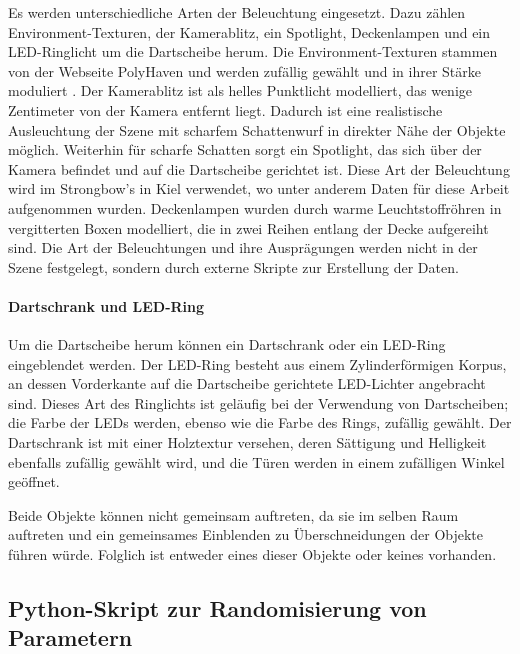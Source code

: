 Es werden unterschiedliche Arten der Beleuchtung eingesetzt. Dazu zählen Environment-Texturen, der Kamerablitz, ein Spotlight, Deckenlampen und ein LED-Ringlicht um die Dartscheibe herum. Die Environment-Texturen stammen von der Webseite PolyHaven und werden zufällig gewählt und in ihrer Stärke moduliert \cite{polyhaven}. Der Kamerablitz ist als helles Punktlicht modelliert, das wenige Zentimeter von der Kamera entfernt liegt. Dadurch ist eine realistische Ausleuchtung der Szene mit scharfem Schattenwurf in direkter Nähe der Objekte möglich. Weiterhin für scharfe Schatten sorgt ein Spotlight, das sich über der Kamera befindet und auf die Dartscheibe gerichtet ist. Diese Art der Beleuchtung wird im Strongbow's in Kiel verwendet, wo unter anderem Daten für diese Arbeit aufgenommen wurden. Deckenlampen wurden durch warme Leuchtstoffröhren in vergitterten Boxen modelliert, die in zwei Reihen entlang der Decke aufgereiht sind. Die Art der Beleuchtungen und ihre Ausprägungen werden nicht in der Szene festgelegt, sondern durch externe Skripte zur Erstellung der Daten.

\paragraph{Dartschrank und LED-Ring}
\label{sec:impl:daten:blender:nebenobjekte:cabinet}

Um die Dartscheibe herum können ein Dartschrank oder ein LED-Ring eingeblendet werden. Der LED-Ring besteht aus einem Zylinderförmigen Korpus, an dessen Vorderkante auf die Dartscheibe gerichtete LED-Lichter angebracht sind. Dieses Art des Ringlichts ist geläufig bei der Verwendung von Dartscheiben; die Farbe der LEDs werden, ebenso wie die Farbe des Rings, zufällig gewählt. Der Dartschrank ist mit einer Holztextur versehen, deren Sättigung und Helligkeit ebenfalls zufällig gewählt wird, und die Türen werden in einem zufälligen Winkel geöffnet.

Beide Objekte können nicht gemeinsam auftreten, da sie im selben Raum auftreten und ein gemeinsames Einblenden zu Überschneidungen der Objekte führen würde. Folglich ist entweder eines dieser Objekte oder keines vorhanden.

\subsection{Python-Skript zur Randomisierung von Parametern}
\label{sec:impl:daten:python}


